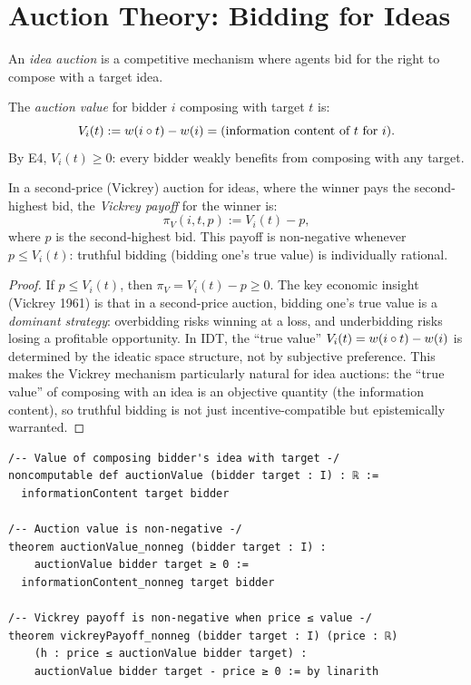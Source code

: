 \section{Auction Theory: Bidding for Ideas}

An \emph{idea auction} is a competitive mechanism where agents bid for
the right to compose with a target idea.

\begin{definition}
\label{def:auction-value}
The \emph{auction value} for bidder $i$ composing with target $t$ is:
\[
V_i(t) := w(i \circ t) - w(i) = \text{(information content of } t \text{ for } i).
\]
By E4, $V_i(t) \geq 0$: every bidder weakly benefits from composing with
any target.
\end{definition}

\begin{theorem}
\label{thm:vickrey}
In a second-price (Vickrey) auction for ideas, where the winner pays the
second-highest bid, the \emph{Vickrey payoff} for the winner is:
\[
\pi_V(i, t, p) := V_i(t) - p,
\]
where $p$ is the second-highest bid. This payoff is non-negative whenever
$p \leq V_i(t)$: truthful bidding (bidding one's true value) is
individually rational.
\end{theorem}

\begin{proof}
If $p \leq V_i(t)$, then $\pi_V = V_i(t) - p \geq 0$. The key
economic insight (Vickrey 1961) is that in a second-price auction,
bidding one's true value is a \emph{dominant strategy}: overbidding
risks winning at a loss, and underbidding risks losing a profitable
opportunity. In IDT, the ``true value'' $V_i(t) = w(i \circ t) - w(i)$
is determined by the ideatic space structure, not by subjective preference.
This makes the Vickrey mechanism particularly natural for idea auctions:
the ``true value'' of composing with an idea is an objective quantity
(the information content), so truthful bidding is not just incentive-compatible
but epistemically warranted.
\end{proof}

\begin{lstlisting}[caption={Lean 4: Vickrey auction for ideas}]
/-- Value of composing bidder's idea with target -/
noncomputable def auctionValue (bidder target : I) : ℝ :=
  informationContent target bidder

/-- Auction value is non-negative -/
theorem auctionValue_nonneg (bidder target : I) :
    auctionValue bidder target ≥ 0 :=
  informationContent_nonneg target bidder

/-- Vickrey payoff is non-negative when price ≤ value -/
theorem vickreyPayoff_nonneg (bidder target : I) (price : ℝ)
    (h : price ≤ auctionValue bidder target) :
    auctionValue bidder target - price ≥ 0 := by linarith
\end{lstlisting}

